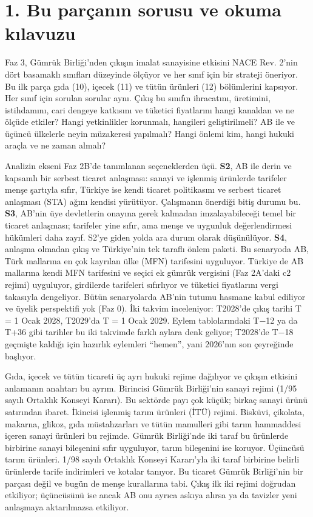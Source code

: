 \hypertarget{nace_kartlar_10-12-1-bu-paruxe7anux131n-sorusu-ve-okuma-kux131lavuzu}{%
\section{1. Bu parçanın sorusu ve okuma kılavuzu}\label{nace_kartlar_10-12-1-bu-paruxe7anux131n-sorusu-ve-okuma-kux131lavuzu}}

Faz 3, Gümrük Birliği'nden çıkışın imalat sanayisine etkisini NACE Rev. 2'nin dört basamaklı sınıfları düzeyinde ölçüyor ve her sınıf için bir strateji öneriyor. Bu ilk parça gıda (10), içecek (11) ve tütün ürünleri (12) bölümlerini kapsıyor. Her sınıf için sorulan sorular aynı. Çıkış bu sınıfın ihracatını, üretimini, istihdamını, cari dengeye katkısını ve tüketici fiyatlarını hangi kanaldan ve ne ölçüde etkiler? Hangi yetkinlikler korunmalı, hangileri geliştirilmeli? AB ile ve üçüncü ülkelerle neyin müzakeresi yapılmalı? Hangi önlemi kim, hangi hukuki araçla ve ne zaman almalı?

Analizin ekseni Faz 2B'de tanımlanan seçeneklerden üçü. \textbf{S2}, AB ile derin ve kapsamlı bir serbest ticaret anlaşması: sanayi ve işlenmiş ürünlerde tarifeler menşe şartıyla sıfır, Türkiye ise kendi ticaret politikasını ve serbest ticaret anlaşması (STA) ağını kendisi yürütüyor. Çalışmanın önerdiği bitiş durumu bu. \textbf{S3}, AB'nin üye devletlerin onayına gerek kalmadan imzalayabileceği temel bir ticaret anlaşması; tarifeler yine sıfır, ama menşe ve uygunluk değerlendirmesi hükümleri daha zayıf. S2'ye giden yolda ara durum olarak düşünülüyor. \textbf{S4}, anlaşma olmadan çıkış ve Türkiye'nin tek taraflı önlem paketi. Bu senaryoda AB, Türk mallarına en çok kayrılan ülke (MFN) tarifesini uyguluyor. Türkiye de AB mallarına kendi MFN tarifesini ve seçici ek gümrük vergisini (Faz 2A'daki c2 rejimi) uyguluyor, girdilerde tarifeleri sıfırlıyor ve tüketici fiyatlarını vergi takasıyla dengeliyor. Bütün senaryolarda AB'nin tutumu hasmane kabul ediliyor ve üyelik perspektifi yok (Faz 0). İki takvim inceleniyor: T2028'de çıkış tarihi T = 1 Ocak 2028, T2029'da T = 1 Ocak 2029. Eylem tablolarındaki T−12 ya da T+36 gibi tarihler bu iki takvimde farklı aylara denk geliyor; T2028'de T−18 geçmişte kaldığı için hazırlık eylemleri ``hemen'', yani 2026'nın son çeyreğinde başlıyor.

Gıda, içecek ve tütün ticareti üç ayrı hukuki rejime dağılıyor ve çıkışın etkisini anlamanın anahtarı bu ayrım. Birincisi Gümrük Birliği'nin sanayi rejimi (1/95 sayılı Ortaklık Konseyi Kararı). Bu sektörde payı çok küçük; birkaç sanayi ürünü satırından ibaret. İkincisi işlenmiş tarım ürünleri (İTÜ) rejimi. Bisküvi, çikolata, makarna, glikoz, gıda müstahzarları ve tütün mamulleri gibi tarım hammaddesi içeren sanayi ürünleri bu rejimde. Gümrük Birliği'nde iki taraf bu ürünlerde birbirine sanayi bileşenini sıfır uyguluyor, tarım bileşenini ise koruyor. Üçüncüsü tarım ürünleri. 1/98 sayılı Ortaklık Konseyi Kararı'yla iki taraf birbirine belirli ürünlerde tarife indirimleri ve kotalar tanıyor. Bu ticaret Gümrük Birliği'nin bir parçası değil ve bugün de menşe kurallarına tabi. Çıkış ilk iki rejimi doğrudan etkiliyor; üçüncüsünü ise ancak AB onu ayrıca askıya alırsa ya da tavizler yeni anlaşmaya aktarılmazsa etkiliyor.

